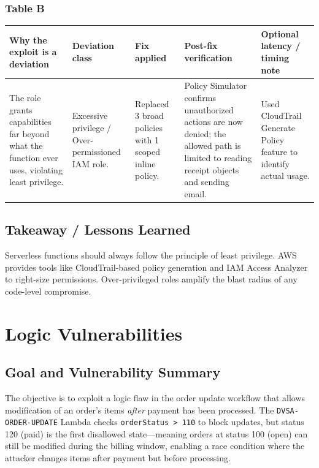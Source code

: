 \documentclass[12pt]{report}
\begin{document}
\subsection*{Table B}
\begin{table}[H]
  \footnotesize
  \centering
  \begin{tabularx}{\textwidth}{|Y|Y|Y|Y|Y|}
    \hline
    \textbf{Why the exploit is a deviation} & \textbf{Deviation class} & \textbf{Fix applied} & \textbf{Post-fix verification} & \textbf{Optional latency / timing note} \\
    \hline
    The role grants capabilities far beyond what the function ever uses, violating least privilege. &
    Excessive privilege / Over-permissioned IAM role. &
    Replaced 3 broad policies with 1 scoped inline policy. &
    Policy Simulator confirms unauthorized actions are now denied; the allowed path is limited to reading receipt objects and sending email. &
    Used CloudTrail Generate Policy feature to identify actual usage. \\
    \hline
  \end{tabularx}
\end{table}

\section{Takeaway / Lessons Learned}
Serverless functions should always follow the principle of least privilege. AWS provides tools like CloudTrail-based policy generation and IAM Access Analyzer to right-size permissions. Over-privileged roles amplify the blast radius of any code-level compromise.

\clearpage

\chapter{Logic Vulnerabilities}

\section{Goal and Vulnerability Summary}
The objective is to exploit a logic flaw in the order update workflow that allows modification of an order's items \emph{after} payment has been processed. The \texttt{DVSA-ORDER-UPDATE} Lambda checks \texttt{orderStatus > 110} to block updates, but status 120 (paid) is the first disallowed state---meaning orders at status 100 (open) can still be modified during the billing window, enabling a race condition where the attacker changes items after payment but before processing.
\end{document}
